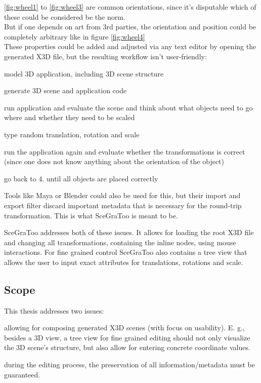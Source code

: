 \ref{fig:wheel1} to \ref{fig:wheel3} are common orientations, since it's disputable which of these
could be considered be the norm.\\
But if one depends on art from 3rd parties, the orientation and position
could be completely arbitrary like in figure \ref{fig:wheel4}\\

These properties could be added and adjusted via any text editor by
opening the generated \gls{X3D} file, but the resulting workflow isn't
user-friendly:

\begin{enumerate*}
  \item model 3D application, including 3D scene structure
  \item generate 3D scene and application code
  \item run application and evaluate the scene and think about what objects need to go where and whether they need to be scaled
  \item type random translation, rotation and scale
  \item run the application again and evaluate whether the transformations is correct (since one does not know anything about the orientation of the object)
  \item go back to 4. until all objects are placed correctly
\end{enumerate*}

Tools like Maya or Blender could also be used for this, but their import
and export filter discard important metadata that is necessary for the
round-trip transformation. This is what SceGraToo is meant to be.

SceGraToo addresses both of these issues. It allows for loading the root
X3D file and changing all transformations, containing the inline nodes,
using mouse interactions. For fine grained control SceGraToo also
contains a tree view that allows the user to input exact attributes for
translations, rotations and scale.

\subsection{Scope}\label{scope}

This thesis addresses two issues:

\begin{enumerate*}
  \item allowing for composing generated X3D scenes (with focus on usability). E. g., besides a 3D view, a tree view for fine grained editing should not only visualize the 3D scene's structure, but also allow for entering concrete coordinate values.
  \item during the editing process, the preservation of all information/metadata must be guaranteed.
\end{enumerate*}
